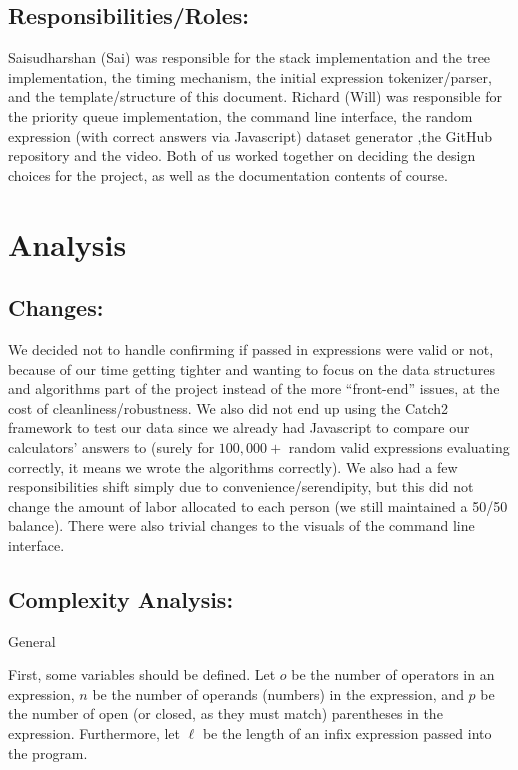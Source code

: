 \documentclass[11pt]{article}
\begin{document}
\subsection*{Responsibilities/Roles:}
Saisudharshan (Sai) was responsible for the stack implementation and the tree implementation, the timing mechanism, the initial expression tokenizer/parser, and the template/structure of this document.
Richard (Will) was responsible for the priority queue implementation, the command line interface, the random expression (with correct answers via Javascript) dataset generator ,the GitHub repository and the video.
Both of us worked together on deciding the design choices for the project, as well as the documentation contents of course.

\noindent\makebox[\linewidth]{\rule{19.1cm}{0.4pt}}

\section*{Analysis}

\subsection*{Changes:}
We decided not to handle confirming if passed in expressions were valid or not, because of our time getting tighter and wanting to focus on the data structures and algorithms part of the project instead of the more ``front-end'' issues, at the cost of cleanliness/robustness.
We also did not end up using the Catch2 framework to test our data since we already had Javascript to compare our calculators' answers to (surely for $100,000+$ random valid expressions evaluating correctly, it means we wrote the algorithms correctly).
We also had a few responsibilities shift simply due to convenience/serendipity, but this did not change the amount of labor allocated to each person (we still maintained a 50/50 balance).
There were also trivial changes to the visuals of the command line interface.

\subsection*{Complexity Analysis:}

\centerline{General}
First, some variables should be defined.
Let $o$ be the number of operators in an expression, $n$ be the number of operands (numbers) in the expression, and $p$ be the number of open (or closed, as they must match) parentheses in the expression. Furthermore, let $\ell$ be the length of an infix expression passed into the program.
\end{document}
